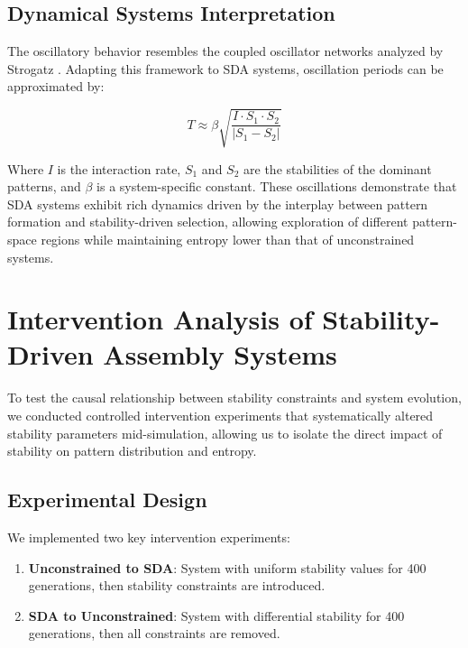 \documentclass[preprint,12pt]{elsarticle}
\begin{document}
\subsection{Dynamical Systems Interpretation}

The oscillatory behavior resembles the coupled oscillator networks analyzed by Strogatz \cite{strogatz2001exploring}. Adapting this framework to SDA systems, oscillation periods can be approximated by:

\begin{equation}
T \approx \beta \sqrt{\frac{I \cdot S_1 \cdot S_2}{|S_1 - S_2|}}
\end{equation}

Where $I$ is the interaction rate, $S_1$ and $S_2$ are the stabilities of the dominant patterns, and $\beta$ is a system-specific constant. These oscillations demonstrate that SDA systems exhibit rich dynamics driven by the interplay between pattern formation and stability-driven selection, allowing exploration of different pattern-space regions while maintaining entropy lower than that of unconstrained systems.

\section{Intervention Analysis of Stability-Driven Assembly Systems}

To test the causal relationship between stability constraints and system evolution, we conducted controlled intervention experiments that systematically altered stability parameters mid-simulation, allowing us to isolate the direct impact of stability on pattern distribution and entropy.

\subsection{Experimental Design}

We implemented two key intervention experiments:

\begin{enumerate}
    \item \textbf{Unconstrained to SDA}: System with uniform stability values for 400 generations, then stability constraints are introduced.
    
    \item \textbf{SDA to Unconstrained}: System with differential stability for 400 generations, then all constraints are removed.
\end{enumerate}
\end{document}
